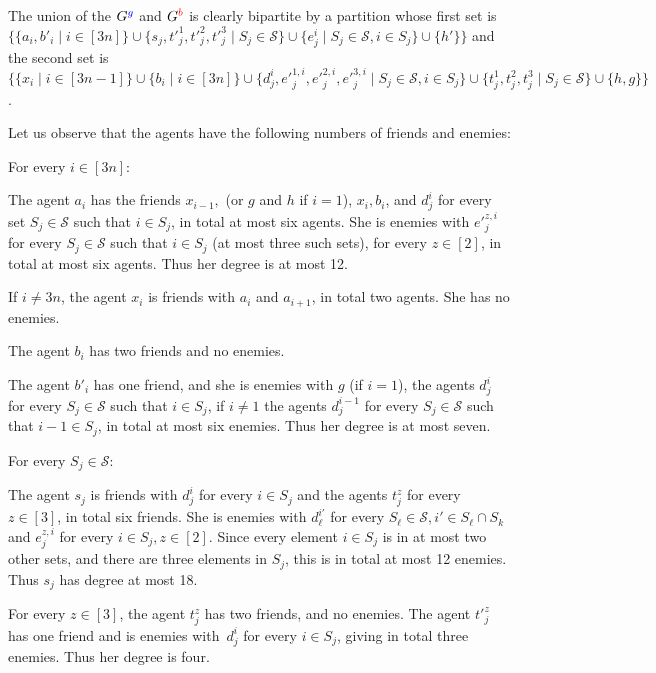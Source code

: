 \documentclass[a4paper,fleqn]{cas-sc}
\newcommand{\friendshipColor}{blue}
\newcommand{\enemyColor}{red}
\newcommand{\friendSuperscript}{{\color{\friendshipColor}g}}
\newcommand{\enemySuperscript}{{\color{\enemyColor}b}}
\newcommand{\friendshipGraph}{\ensuremath{G^{\friendSuperscript}}\xspace}
\newcommand{\enemyGraph}{\ensuremath{G^{\enemySuperscript}}\xspace}
\newcommand{\sets}{\ensuremath{\mathcal{S}}}
\newcommand{\elements}{\ensuremath{[3n]}}
\newcommand{\sset}[1]{\ensuremath{S_{#1}}}
\begin{document}
{The union of the \friendshipGraph and \enemyGraph is clearly bipartite by a partition whose first set is $\{\{a_i, b'_i \mid i \in \elements\} \cup \{s_j, t'^1_j, t'^2_j, t'^3_j \mid \sset j \in \sets\}  \cup \{e^i_j \mid \sset j \in \sets, i \in \sset j\} \cup \{h'\}\}$ and the second set is $\{ \{x_i \mid i \in [3n - 1]\} \cup \{b_i \mid i \in \elements\} \cup \{d^i_j, e'^{1,i}_j, e'^{2,i}_j, e'^{3,i}_j \mid \sset j \in \sets, i \in \sset j\} \cup \{t^1_j, t^2_j, t^3_j \mid \sset j \in \sets\} \cup \{h,g\}\}$.

Let us observe that the agents have the following numbers of friends and enemies:
\begin{compactitem}
\item For every $i \in \elements$:
\begin{compactitem}
\item The agent $a_i$ has the friends $x_{i - 1},$ (or $g$ and $h$ if $i = 1$), $x_i, b_i$, and $d^i_j$ for every set $\sset j \in \sets$ such that $i \in \sset j$, in total at most six agents. She is enemies with $e'^{z,i}_j$ for every $\sset j \in \sets$ such that $i \in \sset j$ (at most three such sets), for every $z \in [2]$, in total at most six agents.
Thus her degree is at most 12.
\item If $i \neq 3n$, the agent $x_i$ is friends with $a_i$ and $a_{i + 1}$, in total two agents. 
She has no enemies.
\item The agent $b_i$ has two friends and no enemies.
\item The agent $b'_i$ has one friend, and she is enemies with $g$ (if $i = 1$), the agents $d^i_j$ for every $\sset j \in \sets$ such that $i \in \sset j$, if $i \neq 1$ the agents $d^{i - 1}_j$ for every $\sset j \in \sets$ such that $i - 1\in \sset j$, in total at most six enemies. Thus her degree is at most seven.
\end{compactitem}
\item For every $\sset j \in \sets$:
\begin{compactitem}
\item The agent $s_j$ is friends with $d^i_j$ for every $i \in \sset j$ and the agents $t^z_j$ for every $z \in [3]$, in total six friends. She is enemies with $d^{i'}_\ell$ for every $\sset \ell \in \sets, i' \in \sset \ell \cap \sset k$ and $e^{z,i}_j$ for every $i \in \sset j, z \in [2]$. Since every element $i \in \sset j$ is in at most two other sets, and there are three elements in $\sset j$, this is in total at most 12 enemies.
Thus $s_j$ has degree at most 18.
\item For every $z \in [3]$, the agent $t^z_j$ has two friends, and no enemies. The agent $t'^z_j$ has one friend and is enemies with~$d^i_j$ for every $i \in \sset j$, giving in total three enemies. Thus her degree is four.

\end{compactitem}
\end{compactitem}}
\end{document}
